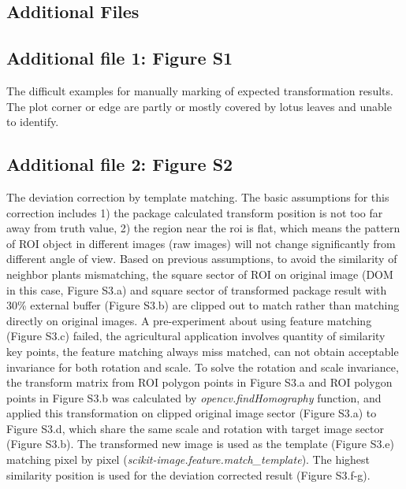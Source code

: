 \documentclass[doublespacing]{configs/bmcart}
\begin{document}
\begin{backmatter}




\section*{Additional Files}

\subsection*{Additional file 1: Figure S1}
The difficult examples for manually marking of expected transformation results. The plot corner or edge are partly or mostly covered by lotus leaves and unable to identify.

\subsection*{Additional file 2: Figure S2}
The deviation correction by template matching. The basic assumptions for this correction includes 1) the package calculated transform position is not too far away from truth value, 2) the region near the \acrshort*{roi} is flat, which means the pattern of ROI object in different images (raw images) will not change significantly from different angle of view. Based on previous assumptions, to avoid the similarity of neighbor plants mismatching, the square sector of ROI on original image (DOM in this case, Figure S3.a) and square sector of transformed package result with 30\% external buffer (Figure S3.b) are clipped out to match rather than matching directly on original images. A pre-experiment about using feature matching (Figure S3.c) failed, the agricultural application involves quantity of similarity key points, the feature matching always miss matched, can not obtain acceptable invariance for both rotation and scale. To solve the rotation and scale invariance, the transform matrix from ROI polygon points in Figure S3.a and ROI polygon points in Figure S3.b was calculated by \textit{opencv.findHomography} function, and applied this transformation on clipped original image sector (Figure S3.a) to Figure S3.d, which share the same scale and rotation with target image sector (Figure S3.b). The transformed new image is used as the template (Figure S3.e) matching pixel by pixel (\textit{scikit-image.feature.match\_template}). The highest similarity position is used for the deviation corrected result (Figure S3.f-g).


\end{backmatter}
\end{document}
